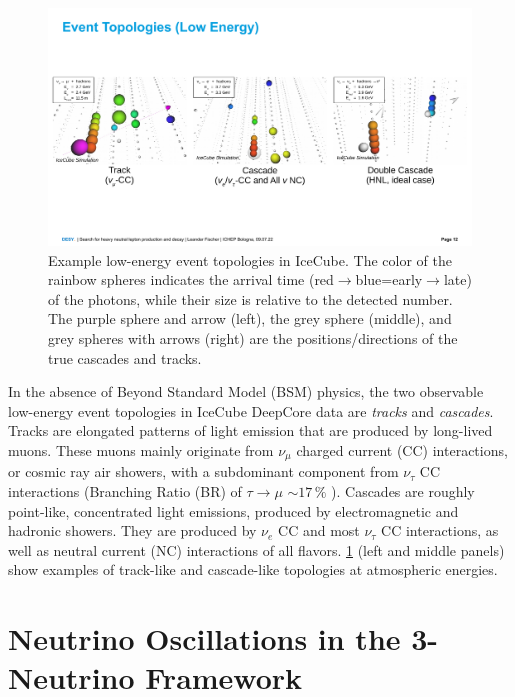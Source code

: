\documentclass[a4paper,11pt]{article}
\begin{document}
\begin{figure}[h!]
    \includegraphics[trim = 0cm 4.5cm 0cm 5.5cm, clip, width=1.0\linewidth]{figures/event_views_all_three.png}
    \caption{Example low-energy event topologies in IceCube. The color of the rainbow spheres indicates the arrival time (red$\rightarrow$blue=early$\rightarrow$late) of the photons, while their size is relative to the detected number. The purple sphere and arrow (left), the grey sphere (middle), and grey spheres with arrows (right) are the positions/directions of the true cascades and tracks.}
    \label{fig:low_energy_eventviews}
  \end{figure}

In the absence of Beyond Standard Model (BSM) physics, the two observable low-energy event topologies in IceCube DeepCore data are \textit{tracks} and \textit{cascades}. Tracks are elongated patterns of light emission that are produced by long-lived muons. These muons mainly originate from $\nu_{\mu}$ charged current (CC) interactions, or cosmic ray air showers, with a subdominant component from $\nu_{\tau}$ CC interactions (Branching Ratio (BR) of $\tau\rightarrow\mu$ $\sim17\,\%$ \cite{PhysRevD.98.030001}). Cascades are roughly point-like, concentrated light emissions, produced by electromagnetic and hadronic showers. They are produced by $\nu_{e}$ CC and most $\nu_{\tau}$ CC interactions, as well as neutral current (NC) interactions of all flavors. \cref{fig:low_energy_eventviews} (left and middle panels) show examples of track-like and cascade-like topologies at atmospheric energies.


\vspace{-0.4cm}
\section{Neutrino Oscillations in the 3-Neutrino Framework} \label{sec:neutrino_oscillations}
\end{document}
